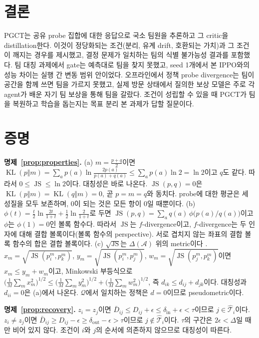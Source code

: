 \documentclass[twocolumn,10pt]{article}
\theoremstyle{remark}
\newcommand{\JS}{\operatorname{JS}}
\newcommand{\KL}{\operatorname{KL}}
\newcommand{\ours}{PGCT}
\begin{document}
\section{결론}
\ours{}는 공유 probe 집합에 대한 응답으로 국소 팀원을 추론하고 그 critic을 distillation한다. 이것이 정당화되는 조건(분리, 유계
drift, 호환되는 가치)과 그 조건이 깨지는 경우를 제시했고, 결정 문제가 일치하는 팀의 식별 불가능성 결과를 포함했다. 팀 대칭
과제에서 gate는 예측대로 팀을 찾지 못했고, seed 1개에서 본 IPPO와의 성능 차이는 실행 간 변동 범위 안이었다. 오프라인에서 정책
probe divergence는 팀이 공간을 함께 쓰면 팀을 가르지 못했고, 실제 방문 상태에서 질의한 보상 모델은 주로 각 agent가 배운 자기 팀
보상을 통해 팀을 갈랐다. 조건이 성립할 수 있을 때 \ours{}가 팀을 복원하고 학습을 돕는지는 목표 분리 본 과제가 답할 질문이다.




\clearpage
\appendix
\onecolumn

\section{증명}
\label{app:proofs}

\textbf{명제~\ref{prop:properties}.}
(a) $m=\frac{p+q}{2}$이면 $\KL(p\Vert m)=\sum_a p(a)\ln\frac{2p(a)}{p(a)+q(a)}\le\sum_a p(a)\ln 2=\ln 2$이고 $q$도 같다. 따라서
$0\le\JS\le\ln2$이다. 대칭성은 바로 나온다. $\JS(p,q)=0$은 $\KL(p\Vert m)=\KL(q\Vert m)=0$, 곧 $p=m=q$와 동치다. probe에 대한
평균은 세 성질을 모두 보존하며, 0이 되는 것은 모든 항이 0일 때뿐이다.
(b) $\phi(t)=\frac{t}{2}\ln\frac{2t}{1+t}+\frac12\ln\frac{2}{1+t}$로 두면 $\JS(p,q)=\sum_a q(a)\,\phi\!\big(p(a)/q(a)\big)$이고
$\phi$는 $\phi(1)=0$인 볼록 함수다. 따라서 $\JS$는 $f$-divergence이고, $f$-divergence는 두 인자에 대해 결합 볼록이다(볼록 함수의
perspective). 서로 겹치지 않는 좌표의 결합 볼록 함수의 합은 결합 볼록이다.
(c) $\sqrt{\JS}$는 $\Delta(\mathcal{A})$ 위의 metric이다 \cite{endres2003metric}. $x_m=\sqrt{\JS(p_i^m,p_k^m)}$,
$y_m=\sqrt{\JS(p_i^m,p_j^m)}$, $w_m=\sqrt{\JS(p_j^m,p_k^m)}$이면 $x_m\le y_m+w_m$이고, Minkowski 부등식으로
$\big(\frac1M\sum_m x_m^2\big)^{1/2}\le\big(\frac1M\sum_m y_m^2\big)^{1/2}+\big(\frac1M\sum_m w_m^2\big)^{1/2}$, 즉
$d_{ik}\le d_{ij}+d_{jk}$이다. 대칭성과 $d_{ii}=0$은 (a)에서 나온다. $\mathcal{Q}$에서 일치하는 정책은 $d=0$이므로 pseudometric이다.

\textbf{명제~\ref{prop:recovery}.} $z_i=z_j$이면 $\bar D_{ij}\le D_{ij}+\epsilon\le\delta_{\mathrm{in}}+\epsilon<\tau$이므로
$j\in\hat{\mathcal{T}}_i$이다. $z_i\ne z_j$이면 $\bar D_{ij}\ge D_{ij}-\epsilon\ge\delta_{\mathrm{out}}-\epsilon>\tau$이므로
$j\notin\hat{\mathcal{T}}_i$이다. $\tau$의 구간은 $2\epsilon<\Delta$일 때만 비어 있지 않다. 조건이 $i$와 $j$의 순서에 의존하지
않으므로 대칭성이 따른다.
\end{document}
